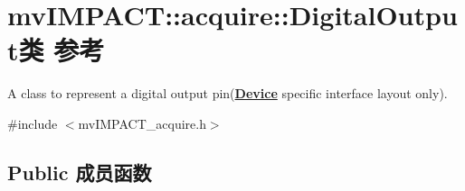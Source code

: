 \hypertarget{classmv_i_m_p_a_c_t_1_1acquire_1_1_digital_output}{\section{mv\+I\+M\+P\+A\+C\+T\+:\+:acquire\+:\+:Digital\+Output类 参考}
\label{classmv_i_m_p_a_c_t_1_1acquire_1_1_digital_output}
}


A class to represent a digital output pin({\bfseries \hyperlink{classmv_i_m_p_a_c_t_1_1acquire_1_1_device}{Device}} specific interface layout only).  




{\ttfamily \#include $<$mv\+I\+M\+P\+A\+C\+T\+\_\+acquire.\+h$>$}

\subsection*{Public 成员函数}
